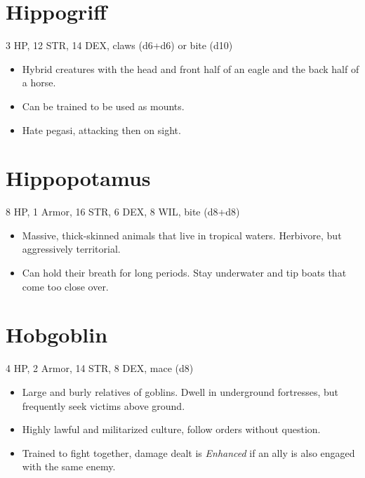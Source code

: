 \documentclass[
  10pt,
  american,
]{article}
\begin{document}
\hypertarget{hippogriff}{%
\section{Hippogriff}\label{hippogriff}}

3 HP, 12 STR, 14 DEX, claws (d6+d6) or bite (d10)

\begin{samepage}
\begin{itemize}
\setlength\itemsep{-.5em}
\item Hybrid creatures with the head and front half of an eagle and the back half of a horse.
\item Can be trained to be used as mounts.
\item Hate pegasi, attacking then on sight.
\end{itemize}
\end{samepage}

\hypertarget{hippopotamus}{%
\section{Hippopotamus}\label{hippopotamus}}

8 HP, 1 Armor, 16 STR, 6 DEX, 8 WIL, bite (d8+d8)

\begin{samepage}
\begin{itemize}
\setlength\itemsep{-.5em}
\item Massive, thick-skinned animals that live in tropical waters. Herbivore, but aggressively territorial.
\item Can hold their breath for long periods. Stay underwater and tip boats that come too close over.
\end{itemize}
\end{samepage}

\hypertarget{hobgoblin}{%
\section{Hobgoblin}\label{hobgoblin}}

4 HP, 2 Armor, 14 STR, 8 DEX, mace (d8)

\begin{samepage}
\begin{itemize}
\setlength\itemsep{-.5em}
\item Large and burly relatives of goblins. Dwell in underground fortresses, but frequently seek victims above ground.
\item Highly lawful and militarized culture, follow orders without question.
\item Trained to fight together, damage dealt is \emph{Enhanced} if an ally is also engaged with the same enemy.
\end{itemize}
\end{samepage}
\end{document}
